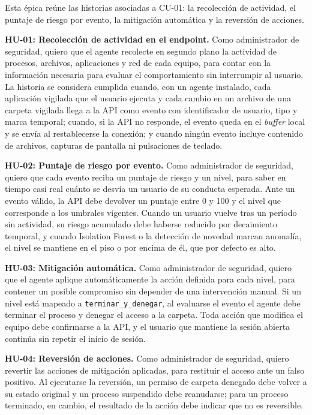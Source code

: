 Esta épica reúne las historias asociadas a CU-01: la recolección de actividad, el puntaje de riesgo por evento, la mitigación automática y la reversión de acciones.

\textbf{HU-01: Recolección de actividad en el endpoint.} Como administrador de seguridad, quiero que el agente recolecte en segundo plano la actividad de procesos, archivos, aplicaciones y red de cada equipo, para contar con la información necesaria para evaluar el comportamiento sin interrumpir al usuario. La historia se considera cumplida cuando, con un agente instalado, cada aplicación vigilada que el usuario ejecuta y cada cambio en un archivo de una carpeta vigilada llega a la API como evento con identificador de usuario, tipo y marca temporal; cuando, si la API no responde, el evento queda en el \emph{buffer} local y se envía al restablecerse la conexión; y cuando ningún evento incluye contenido de archivos, capturas de pantalla ni pulsaciones de teclado.

\textbf{HU-02: Puntaje de riesgo por evento.} Como administrador de seguridad, quiero que cada evento reciba un puntaje de riesgo y un nivel, para saber en tiempo casi real cuánto se desvía un usuario de su conducta esperada. Ante un evento válido, la API debe devolver un puntaje entre 0 y 100 y el nivel que corresponde a los umbrales vigentes. Cuando un usuario vuelve tras un período sin actividad, su riesgo acumulado debe haberse reducido por decaimiento temporal, y cuando Isolation Forest o la detección de novedad marcan anomalía, el nivel se mantiene en el piso o por encima de él, que por defecto es alto.

\textbf{HU-03: Mitigación automática.} Como administrador de seguridad, quiero que el agente aplique automáticamente la acción definida para cada nivel, para contener un posible compromiso sin depender de una intervención manual. Si un nivel está mapeado a \texttt{terminar\_y\_denegar}, al evaluarse el evento el agente debe terminar el proceso y denegar el acceso a la carpeta. Toda acción que modifica el equipo debe confirmarse a la API, y el usuario que mantiene la sesión abierta continúa sin repetir el inicio de sesión.

\textbf{HU-04: Reversión de acciones.} Como administrador de seguridad, quiero revertir las acciones de mitigación aplicadas, para restituir el acceso ante un falso positivo. Al ejecutarse la reversión, un permiso de carpeta denegado debe volver a su estado original y un proceso suspendido debe reanudarse; para un proceso terminado, en cambio, el resultado de la acción debe indicar que no es reversible.

